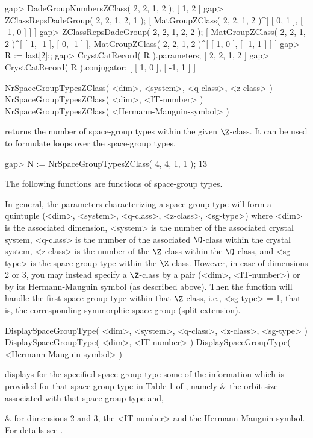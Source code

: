 \beginexample
gap> DadeGroupNumbersZClass( 2, 2, 1, 2 );
[ 1, 2 ]
gap> ZClassRepsDadeGroup( 2, 2, 1, 2, 1 );
[ MatGroupZClass( 2, 2, 1, 2 )^[ [ 0, 1 ], [ -1, 0 ] ] ]
gap> ZClassRepsDadeGroup( 2, 2, 1, 2, 2 );
[ MatGroupZClass( 2, 2, 1, 2 )^[ [ 1, -1 ], [ 0, -1 ] ],
  MatGroupZClass( 2, 2, 1, 2 )^[ [ 1, 0 ], [ -1, 1 ] ] ]
gap> R := last[2];;
gap> CrystCatRecord( R ).parameters;
[ 2, 2, 1, 2 ]
gap> CrystCatRecord( R ).conjugator;
[ [ 1, 0 ], [ -1, 1 ] ]
\endexample


\>NrSpaceGroupTypesZClass( <dim>, <system>, <q-class>, <z-class> )
\>NrSpaceGroupTypesZClass( <dim>, <IT-number> )
\>NrSpaceGroupTypesZClass( <Hermann-Mauguin-symbol> )

returns the number of space-group types within the given $\Z$-class.
It can be used to formulate loops over the space-group types.

\beginexample
gap> N := NrSpaceGroupTypesZClass( 4, 4, 1, 1 );
13
\endexample

The following functions are functions of space-group types.

In general, the parameters characterizing a space-group type will form
a quintuple (<dim>, <system>, <q-class>, <z-class>, <sg-type>) where
<dim> is the associated dimension, <system> is the number of the
associated crystal system, <q-class> is the number of the associated
$\Q$-class within the crystal system, <z-class> is the number of the
$\Z$-class within the $\Q$-class, and <sg-type> is the space-group
type within the $\Z$-class.  However, in case of dimensions 2 or 3,
you may instead specify a $\Z$-class by a pair (<dim>, <IT-number>)
or by its Hermann-Mauguin symbol (as described above).  Then the
function will handle the first space-group type within that
$\Z$-class, i.e., <sg-type> = 1, that is, the corresponding
symmorphic space group (split extension).

\>DisplaySpaceGroupType( <dim>, <system>, <q-class>, <z-class>, <sg-type> )
\>DisplaySpaceGroupType( <dim>, <IT-number> )
\>DisplaySpaceGroupType( <Hermann-Mauguin-symbol> )

displays for the specified space-group type some of the information
which is provided for that space-group type in Table 1 of
\cite{BBNWZ78}, namely
\beginitems
& \itm the orbit size associated with that space-group type and,

& \itm for dimensions  2 and 3,  the <IT-number>  and  the Hermann-Mauguin
       symbol.
\enditems
For details see \cite{BBNWZ78}.

